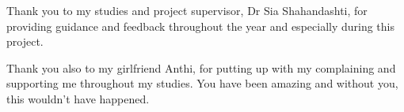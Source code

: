 \documentclass[../main.tex]{subfiles}
\begin{document}
Thank you to my studies and project supervisor, Dr Sia Shahandashti, for providing guidance and feedback throughout the year and especially during this project.

Thank you also to my girlfriend Anthi, for putting up with my complaining and supporting me throughout my studies. You have been amazing and without you, this wouldn't have happened.
\end{document}
